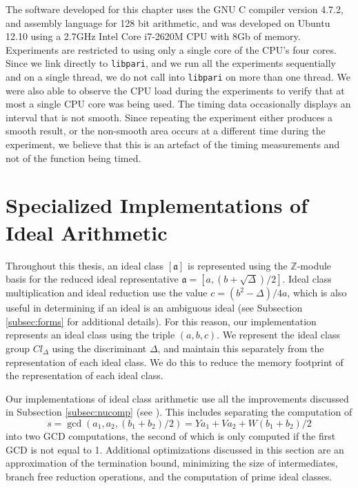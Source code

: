 \documentclass{ucalgthes1}
\theoremstyle{definition}
\newcommand{\ZZ}{\mathbb{Z}}
\newcommand{\compiler}{GNU C compiler version 4.7.2}
\newcommand{\cpu}{2.7GHz Intel Core i7-2620M CPU}
\begin{document}
The software developed for this chapter uses the \compiler{}, and assembly language for 128 bit arithmetic, and was developed on Ubuntu 12.10 using a \cpu{} with 8Gb of memory.  Experiments are restricted to using only a single core of the CPU's four cores.  Since we link directly to \texttt{libpari}, and we run all the experiments sequentially and on a single thread, we do not call into \texttt{libpari} on more than one thread.  We were also able to observe the CPU load during the experiments to  verify that at most a single CPU core was being used.  The timing data occasionally displays an interval that is not smooth.  Since repeating the experiment either produces a smooth result, or the non-smooth area occurs at a different time during the experiment, we believe that this is an artefact of the timing measurements and not of the function being timed.

\section{Specialized Implementations of Ideal Arithmetic}
\label{sec:implementationOfIdealArithmetic}

Throughout this thesis, an ideal class $[\mathfrak a]$ is represented using the $\ZZ$-module basis for the reduced ideal representative $\mathfrak a = [a, (b + \sqrt{\Delta})/2]$.  Ideal class multiplication and ideal reduction use the value $c = (b^2 - \Delta)/4a$, which is also useful in determining if an ideal is an ambiguous ideal (see Subsection \ref{subsec:forms} for additional details).  For this reason, our implementation represents an ideal class using the triple $(a, b, c)$.  We represent the ideal class group $Cl_\Delta$ using the discriminant $\Delta$, and maintain this separately from the representation of each ideal class.  We do this to reduce the memory footprint of the representation of each ideal class.

Our implementations of ideal class arithmetic use all the improvements discussed in Subsection \ref{subsec:nucomp} (see \cite[Algorithm~6]{Imbert2010}).  This includes separating the computation of
\[
s = \gcd(a_1, a_2, (b_1+b_2)/2) = Ya_1 + Va_2 + W(b_1+b_2)/2
\]
into two GCD computations, the second of which is only computed if the first GCD is not equal to 1.  Additional optimizations discussed in this section are an approximation of the termination bound, minimizing the size of intermediates, branch free reduction operations, and the computation of prime ideal classes.
\end{document}
